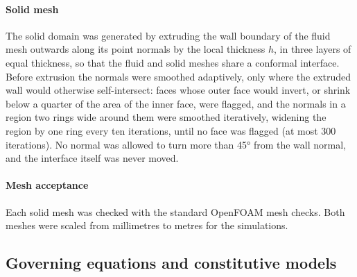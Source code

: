\paragraph{Solid mesh}
The solid domain was generated by extruding the wall boundary of the fluid mesh outwards along its point normals by the local thickness $h$, in three layers of equal thickness, so that the fluid and solid meshes share a conformal interface.
Before extrusion the normals were smoothed adaptively, only where the extruded wall would otherwise self-intersect: faces whose outer face would invert, or shrink below a quarter of the area of the inner face, were flagged, and the normals in a region two rings wide around them were smoothed iteratively, widening the region by one ring every ten iterations, until no face was flagged (at most 300 iterations).
No normal was allowed to turn more than \ang{45} from the wall normal, and the interface itself was never moved.

\paragraph{Mesh acceptance}
Each solid mesh was checked with the standard OpenFOAM mesh checks.
Both meshes were scaled from millimetres to metres for the simulations.

\subsection{Governing equations and constitutive models}\label{sec:models}

